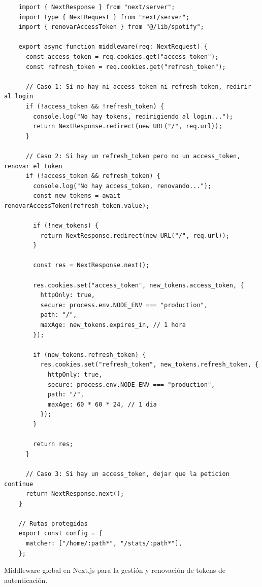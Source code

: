 \begin{ifalgorithm}[H]
  \begin{lstlisting}
    import { NextResponse } from "next/server";
    import type { NextRequest } from "next/server";
    import { renovarAccessToken } from "@/lib/spotify";

    export async function middleware(req: NextRequest) {
      const access_token = req.cookies.get("access_token");
      const refresh_token = req.cookies.get("refresh_token");

      // Caso 1: Si no hay ni access_token ni refresh_token, redirir al login
      if (!access_token && !refresh_token) {
        console.log("No hay tokens, redirigiendo al login...");
        return NextResponse.redirect(new URL("/", req.url));
      }

      // Caso 2: Si hay un refresh_token pero no un access_token, renovar el token
      if (!access_token && refresh_token) {
        console.log("No hay access_token, renovando...");
        const new_tokens = await renovarAccessToken(refresh_token.value);

        if (!new_tokens) {
          return NextResponse.redirect(new URL("/", req.url));
        }

        const res = NextResponse.next();

        res.cookies.set("access_token", new_tokens.access_token, {
          httpOnly: true,
          secure: process.env.NODE_ENV === "production",
          path: "/",
          maxAge: new_tokens.expires_in, // 1 hora
        });

        if (new_tokens.refresh_token) {
          res.cookies.set("refresh_token", new_tokens.refresh_token, {
            httpOnly: true,
            secure: process.env.NODE_ENV === "production",
            path: "/",
            maxAge: 60 * 60 * 24, // 1 dia
          });
        }

        return res;
      }

      // Caso 3: Si hay un access_token, dejar que la peticion continue
      return NextResponse.next();
    }

    // Rutas protegidas
    export const config = {
      matcher: ["/home/:path*", "/stats/:path*"],
    };
    \end{lstlisting}
  \caption{Middleware global en Next.js para la gestión y renovación de tokens de autenticación.}
  \label{alg:middleware}
\end{ifalgorithm}

